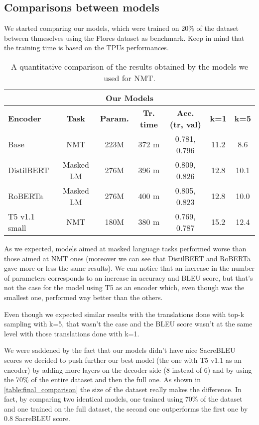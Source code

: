 \subsection{Comparisons between models}
We started comparing our models, which were trained on 20\% of the dataset between thmeselves using the Flores dataset as benchmark. Keep in mind that the training time is based on the TPUs performances.
\begin{table}[H]
\centering
\begin{tabular}{l|c|c|c|c|c|c}\hline \hline
\multicolumn{7}{c}{\textbf{Our Models}} \\\hline
\textbf{Encoder} & \textbf{Task} & \textbf{Param.} & \textbf{Tr. time} & \textbf{Acc. (tr, val)} & \textbf{k=1} & \textbf{k=5}\\\hline
Base & NMT & 223M & 372 m & 0.781, 0.796 & 11.2 & 8.6\\
DistilBERT & Masked LM & 276M & 396 m & 0.809, 0.826 & 12.8 & 10.1\\
RoBERTa & Masked LM & 276M & 400 m & 0.805, 0.823 & 12.8 & 10.0\\
T5 v1.1 small & NMT & 180M & 380 m & 0.769, 0.787 & 15.2 & 12.4\\\hline \hline
\end{tabular}
\caption{A quantitative comparison of the results obtained by the models we used for NMT.}
\end{table}
As we expected, models aimed at masked language tasks performed worse than those aimed at NMT ones (moreover we can see that DistilBERT and RoBERTa gave more or less the same results). We can notice that an increase in the number of parameters corresponds to an increase in accuracy and BLEU score, but that's not the case for the model using T5 as an encoder which, even though was the smallest one, performed way better than the others.
\vspace{3mm}

Even though we expected similar results with the translations done with top-k sampling with k=5, that wasn't the case and the BLEU score wasn't at the same level with those translations done with k=1.
\vspace{3mm}

We were saddened by the fact that our models didn't have nice SacreBLEU scores we decided to push further our best model (the one with T5 v1.1 as an encoder) by adding more layers on the decoder side (8 instead of 6) and by using the 70\% of the entire dataset and then the full one. As shown in \ref{table:final_comparison} the size of the dataset really makes the difference. In fact, by comparing two identical models, one trained using 70\% of the dataset and one trained on the full dataset, the second one outperforms the first one by 0.8 SacreBLEU score.

